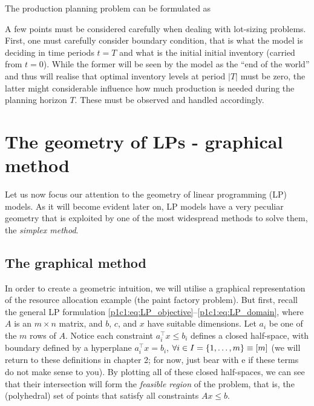The production planning problem can be formulated as
%
%

A few points must be considered carefully when dealing with lot-sizing problems. First, one must carefully consider boundary condition, that is what the model is deciding in time periods $t = T$ and what is the initial initial inventory (carried from $t=0$). While the former will be seen by the model as the ``end of the world'' and thus will realise that optimal inventory levels at period $|T|$ must be zero, the latter might considerable influence how much production is needed during the planning horizon $T$. These must be observed and handled accordingly. 
 


\section{The geometry of LPs - graphical method} 

Let us now focus our attention to the geometry of linear programming (LP) models. As it will become evident later on, LP models have a very peculiar geometry that is exploited by one of the most widespread methods to solve them, the \emph{simplex method}. 

\subsection{The graphical method}

In order to create a geometric intuition, we will utilise a graphical representation of the resource allocation example (the paint factory problem). But first, recall the general LP formulation \eqref{p1c1:eq:LP_objective}--\eqref{p1c1:eq:LP_domain}, where $A$ is an $m \times n$ matrix, and $b$, $c$, and $x$ have suitable dimensions. Let $a_i$ be one of the $m$ rows of $A$. Notice each constraint $a_i^\top x \leq b_i$ defines a closed half-space, with boundary defined by a hyperplane $a_i^\top x= b_i$, $\forall i \in I = \left\{ 1,\dots,m \right \} \equiv [m]$ (we will return to these definitions in chapter 2; for now, just bear with e if these terms do not make sense to you). By plotting all of these closed half-spaces, we can see that their intersection will form the \emph{feasible region} of the problem, that is, the (polyhedral) set of points that satisfy all constraints $Ax \le b$. 


